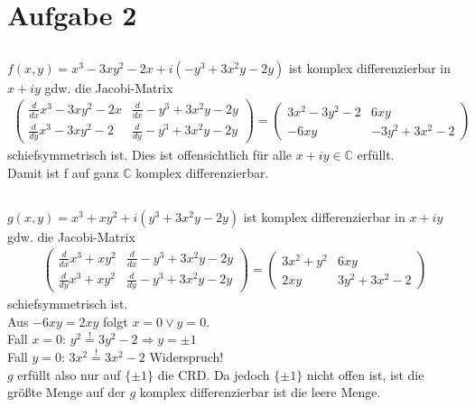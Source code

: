
	\section{Aufgabe 2}
	
	\subsection{}
    $f(x,y)=x^3-3xy^2-2x+i(-y^3+3x^2y-2y) $ ist komplex differenzierbar in $x+iy$ gdw. die Jacobi-Matrix
    \begin{align*}
    \begin{pmatrix}
	\frac{d}{dx}x^3-3xy^2-2x & \frac{d}{dx}-y^3+3x^2y-2y\\ 
	\frac{d}{dy}x^3-3xy^2-2 & \frac{d}{dy}-y^3+3x^2y-2y
	\end{pmatrix}
	=\begin{pmatrix}
	3x^2-3y^2-2 & 6xy\\
    -6xy & -3y^2+3x^2-2
    \end{pmatrix}
    \end{align*}
    schiefsymmetrisch ist. Dies ist offensichtlich für alle $x+iy \in \mathbb{C}$ erfüllt.\\
    Damit ist f auf ganz $\mathbb{C}$ komplex differenzierbar.
    
    \subsection{}
    $g(x,y)=x^3+xy^2+i(y^3+3x^2y-2y) $ ist komplex differenzierbar in $x+iy$ gdw. die Jacobi-Matrix
    \begin{align*}
    \begin{pmatrix}
	\frac{d}{dx}x^3+xy^2 & \frac{d}{dx}-y^3+3x^2y-2y\\ 
	\frac{d}{dy}x^3+xy^2 & \frac{d}{dy}-y^3+3x^2y-2y
	\end{pmatrix}
	=\begin{pmatrix}
	3x^2+y^2 & 6xy\\
    2xy & 3y^2+3x^2-2
    \end{pmatrix}
    \end{align*}
    schiefsymmetrisch ist.\\
    Aus $-6xy=2xy$ folgt $x=0 \lor y=0$.\\
    Fall $x=0$: $y^2\stackrel{!}{=} 3y^2-2\Rightarrow y=\pm1$\\
    Fall $y=0$: $3x^2\stackrel{!}{=} 3x^2-2$ Widerspruch!\\
    $g$ erfüllt also nur auf $\{ \pm1 \}$ die CRD. Da jedoch $\{\pm1\}$ nicht offen ist, ist die größte Menge auf der $g$ komplex differenzierbar ist die leere Menge.
